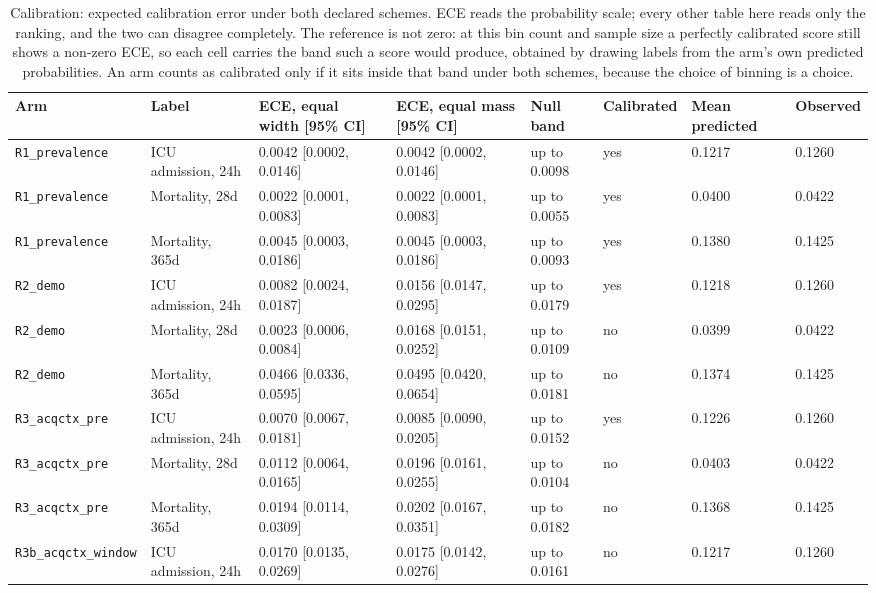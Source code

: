 \begin{table}[t]
\centering
\small
\caption{Calibration: expected calibration error under both declared schemes. ECE reads the probability scale; every other table here reads only the ranking, and the two can disagree completely. The reference is not zero: at this bin count and sample size a perfectly calibrated score still shows a non-zero ECE, so each cell carries the band such a score would produce, obtained by drawing labels from the arm's own predicted probabilities. An arm counts as calibrated only if it sits inside that band under both schemes, because the choice of binning is a choice.}
\label{tab:calibration}
\begin{tabular}{llllllll}
\toprule
Arm & Label & ECE, equal width [95\% CI] & ECE, equal mass [95\% CI] & Null band & Calibrated & Mean predicted & Observed \\
\midrule
\texttt{R1\_prevalence} & ICU admission, 24h & 0.0042 [0.0002, 0.0146] & 0.0042 [0.0002, 0.0146] & up to 0.0098 & yes & 0.1217 & 0.1260 \\
\texttt{R1\_prevalence} & Mortality, 28d & 0.0022 [0.0001, 0.0083] & 0.0022 [0.0001, 0.0083] & up to 0.0055 & yes & 0.0400 & 0.0422 \\
\texttt{R1\_prevalence} & Mortality, 365d & 0.0045 [0.0003, 0.0186] & 0.0045 [0.0003, 0.0186] & up to 0.0093 & yes & 0.1380 & 0.1425 \\
\texttt{R2\_demo} & ICU admission, 24h & 0.0082 [0.0024, 0.0187] & 0.0156 [0.0147, 0.0295] & up to 0.0179 & yes & 0.1218 & 0.1260 \\
\texttt{R2\_demo} & Mortality, 28d & 0.0023 [0.0006, 0.0084] & 0.0168 [0.0151, 0.0252] & up to 0.0109 & no & 0.0399 & 0.0422 \\
\texttt{R2\_demo} & Mortality, 365d & 0.0466 [0.0336, 0.0595] & 0.0495 [0.0420, 0.0654] & up to 0.0181 & no & 0.1374 & 0.1425 \\
\texttt{R3\_acqctx\_pre} & ICU admission, 24h & 0.0070 [0.0067, 0.0181] & 0.0085 [0.0090, 0.0205] & up to 0.0152 & yes & 0.1226 & 0.1260 \\
\texttt{R3\_acqctx\_pre} & Mortality, 28d & 0.0112 [0.0064, 0.0165] & 0.0196 [0.0161, 0.0255] & up to 0.0104 & no & 0.0403 & 0.0422 \\
\texttt{R3\_acqctx\_pre} & Mortality, 365d & 0.0194 [0.0114, 0.0309] & 0.0202 [0.0167, 0.0351] & up to 0.0182 & no & 0.1368 & 0.1425 \\
\texttt{R3b\_acqctx\_window} & ICU admission, 24h & 0.0170 [0.0135, 0.0269] & 0.0175 [0.0142, 0.0276] & up to 0.0161 & no & 0.1217 & 0.1260 \\

\end{tabular}
\end{table}
